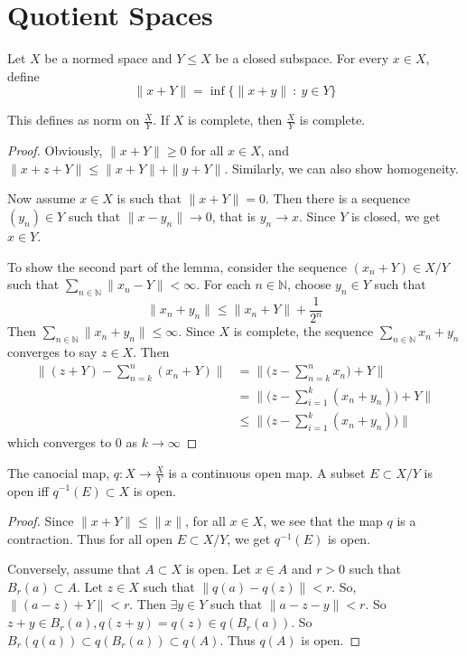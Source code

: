 
\section{Quotient Spaces}
\begin{definition}
  Let $X$ be a normed space and $Y \leqslant X$ be a closed
  subspace. For every $x \in X$, define \[
    \|x + Y\| = \inf \{ \|x+y\| \ : \ y \in Y \}
  \]
\end{definition}
\begin{lemma}
  This defines as norm on  $\frac{X}{Y}$. If $X$ is complete, then
  $ \frac{X}{Y}$ is complete.
\end{lemma}
\begin{proof}
  Obviously, $\|x+Y\| \ge 0 $ for all $ x \in X$, and $\|x+z + Y\|
  \le \|x+Y\| + \|y + Y\|$. Similarly, we can also show homogeneity.

  Now assume $x \in X$ is such that $\|x+Y\| = 0$. Then there is a
  sequence $(y_n) \in Y$ such that $ \|x - y_n\| \to 0$, that is
  $y_n \to x$. Since $Y$ is closed, we get $x \in Y$.

  To show the second part of the lemma, consider the sequence $(x_n
  + Y) \in X/Y$ such that $\sum_{n \in \mathbb{N}} \|x_n - Y\| <
  \infty$. For each $ n \in \mathbb{N}$, choose $y_n \in Y$ such that \[
    \|x_n + y_n\| \le \|x_n + Y\| + \frac{1}{2^n}
  \]
  Then $\sum_{n \in \mathbb{N}} \|x_n + y_n\| \le \infty$. Since
  $X$ is complete, the sequence $ \sum_{n \in \mathbb{N}} x_n +
  y_n$ converges to say $z \in X$. Then
  \begin{align*}
    \|(z+Y) - \sum_{n = k}^{n} (x_n +Y)\| &= \|\Big( z - \sum_{n =
    k}^{n} x_n \Big) + Y\| \\
    & = \|\Big( z - \sum_{i = 1}^{k}(x_n + y_n) \Big) + Y\| \\
    & \le \|\Big( z - \sum_{i = 1}^{k}(x_n + y_n) \Big) \|
  \end{align*}
  which converges to 0 as $k \to \infty$
\end{proof}

\begin{lemma}
  The canocial map, $q: X \to \frac{X}{Y}$ is a continuous open
  map. A subset $E \subset X/Y$ is open iff $ q^{-1}(E) \subset X$ is open.
\end{lemma}
\begin{proof}
  Since $\|x + Y\| \le \|x\|$,  for all $x \in X$, we see that the
  map $q$ is a contraction. Thus  for all open $E \subset X/Y$, we
  get $ q^{-1}(E)$ is open.

  Conversely, assume that $  A \subset X$ is open. Let $ x \in A$
  and $ r > 0$ such that $B_r(a) \subset A$. Let $  z \in X$ such
  that $\|q(a) - q(z)\| < r$. So, $\|(a-z) + Y\| < r$. Then
  $\exists y \in Y$ such that $ \|a-z-y\| < r$. So $z+y \in B_r(a),
  q( z+y) = q( z) \in q( B_r(a))$. So $B_r(q(a)) \subset q(
  B_r(a)) \subset q(A)$. Thus $q(A)$ is open.
\end{proof}
